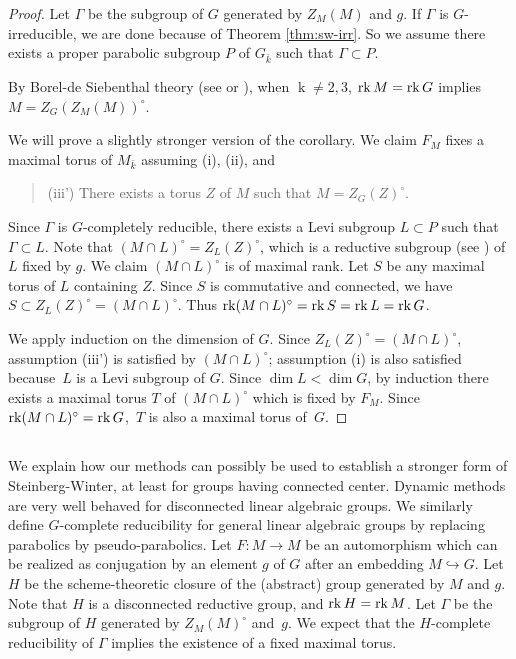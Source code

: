 \documentclass[10pt,a4paper,twoside]{article}
\begin{document}
\begin{proof}
Let $\Gamma$ be the subgroup of $G$ generated by
$Z_M(M)$ and $g$.
If $\Gamma$ is $G$-irreducible, we are done because of Theorem \ref{thm:sw-irr}.
So we assume there exists a proper parabolic subgroup $P$ of $G_{\bar k}$ such that $\Gamma \subset P$.

By Borel-de Siebenthal theory (see \cite{Pep15} or \cite[Theorem 0.1]{Gil10}), when $\operatorname{k}\ne 2,3$, $\operatorname{rk} M = \operatorname{rk} G$ implies
$M=Z_G(Z_M(M))^\circ$.

We will prove a slightly stronger version of the corollary. We claim $F_M$ fixes a maximal torus of $M_{\bar k}$ assuming (i), (ii), and

\begin{quotation}
(iii') There exists a torus $Z$ of $M$ such that $M = Z_G(Z)^\circ$.
\end{quotation}

Since $\Gamma$ is $G$-completely reducible, there exists a Levi subgroup $L\subset P$
such that $\Gamma \subset L$.
Note that $(M \cap L)^\circ = Z_L(Z)^\circ$, which is a reductive subgroup (see \cite[Lemma 0.2(1)]{Gil10}) of $L$ fixed by $g$.
We claim $(M\cap L)^\circ$ is of maximal rank.
Let $S$ be any maximal torus of $L$ containing $Z$.
Since $S$ is commutative and connected, we have $S \subset Z_L(Z)^\circ = (M \cap L)^\circ$.
Thus $\operatorname{rk} (M \cap L)^\circ = \operatorname{rk} S =  \operatorname{rk} L = \operatorname{rk} G$.

We apply induction on the dimension of $G$.
Since $Z_L(Z)^\circ = (M\cap L)^\circ$, assumption (iii') is satisfied by $(M\cap L)^\circ$;
assumption (i) is also satisfied because~$L$ is a Levi subgroup of $G$.
Since $\dim L < \dim G$, by induction
there exists a maximal torus
$T$ of $(M \cap L)^\circ$ which is fixed by $F_M$.
Since $\operatorname{rk} (M \cap L)^\circ = \operatorname{rk} G$,~$T$ is also a maximal torus of~$G$.
\end{proof}


\subsection{}
We explain how our methods can possibly be used to establish a stronger form of
Steinberg-Winter, at least for groups having connected center.
Dynamic methods are very well behaved for disconnected linear algebraic groups.
We similarly define $G$-complete reducibility for general linear algebraic groups
by replacing parabolics by pseudo-parabolics.
Let $F: M\to M$ be an automorphism
which can be realized as conjugation by an element $g$ of $G$ after an embedding $M \hookrightarrow G$.
Let $H$ be the scheme-theoretic closure of the (abstract) group generated by $M$ and $g$.
Note that $H$ is a disconnected reductive group, and $\operatorname{rk} H = \operatorname{rk} M$.
Let $\Gamma$ be the subgroup of $H$ generated by $Z_M(M)^\circ$ and~$g$.
We expect that the $H$-complete reducibility of $\Gamma$ implies the existence of a fixed maximal torus.
\end{document}
